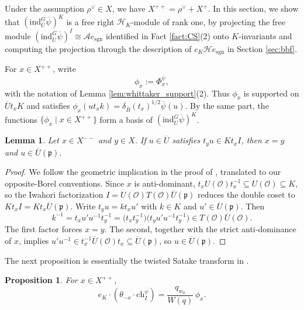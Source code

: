 \documentclass[12pt]{article}
\numberwithin{equation}{section}
\newtheorem{lemma}[theorem]{Lemma}
\newtheorem{proposition}[theorem]{Proposition}
\theoremstyle{definition}
\theoremstyle{remark}
\theoremstyle{plain}
\begin{document}
Under the assumption $\rho^\vee \in X$, we have $X^{++} = \rho^\vee + X^{+}$. In this section, we show that $(\mathrm{ind}_{\overline{U}}^{G}\overline{\psi})^{K}$ is a free right $\mathcal{H}_{K}$-module of rank one, by projecting the free module $(\mathrm{ind}_{\overline{U}}^{G}\overline{\psi})^{I} \cong \mathcal{A}e_{\mathrm{sgn}}$ identified in Fact \ref{fact:CS}(2) onto $K$-invariants and computing the projection through the description of $e_K\mathcal{H}e_{\mathrm{sgn}}$ in Section \ref{sec:bbf}.

For $x\in X^{++}$, write
$$\phi_x:=\Phi^{\overline\psi}_x,$$
with the notation of Lemma \ref{lem:whittaker_support}(2). Thus $\phi_x$ is supported on $\overline U t_xK$ and satisfies $\phi_x(ut_xk)=\delta_{\overline B}(t_x)^{1/2}\overline\psi(u)$. By the same part, the functions $\{\phi_x\mid x\in X^{++}\}$ form a basis of $(\mathrm{ind}_{\overline U}^G\overline\psi)^K$.

\begin{lemma}\label{lem:Kt_x_I_TUbar}
Let $x \in X^{--}$ and $y \in X$. If $u \in \overline{U}$ satisfies $t_{y} u \in K t_{x} I$, then $x = y$ and $u \in \overline{U}(\mathfrak p)$.
\end{lemma}

\begin{proof}
We follow the geometric implication in the proof of \cite[Lemma 5.3]{GK22}, translated to our opposite-Borel conventions. Since $x$ is anti-dominant, $t_{x} U(\mathcal O) t_{x}^{-1} \subseteq U(\mathcal O) \subseteq K$, so the Iwahori factorization $I = U(\mathcal O)T(\mathcal O)\overline{U}(\mathfrak p)$ reduces the double coset to $K t_{x} I = K t_{x} \overline{U}(\mathfrak p)$. Write $t_{y}u = kt_{x}u'$ with $k \in K$ and $u' \in \overline{U}(\mathfrak p)$. Then
$$k^{-1} = t_{x}u'u^{-1}t_{y}^{-1} = \big(t_{x}t_{y}^{-1}\big)\big(t_{y}u'u^{-1}t_{y}^{-1}\big) \in T(\mathcal O)\overline{U}(\mathcal O).$$
The first factor forces $x = y$. The second, together with the strict anti-dominance of $x$, implies $u'u^{-1} \in t_{x}^{-1}\overline{U}(\mathcal O)t_{x} \subseteq \overline{U}(\mathfrak p)$, so $u \in \overline{U}(\mathfrak p)$.
\end{proof}

The next proposition is essentially the twisted Satake transform in \cite{Gu13, GK22}.

\begin{proposition}\label{prop:twisted_satake}
For $x \in X^{++}$,
    $$e_{K}\cdot(\theta_{-x}\cdot \mathrm{ch}_{I}^{\overline{\psi}}) = \frac{q_{w_0}}{W(q)}\,\phi_{x}. $$
\end{proposition}
\end{document}
